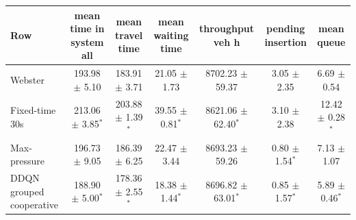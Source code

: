 \begin{tabular}{lcccccc}
\toprule
Row & mean time in system all & mean travel time & mean waiting time & throughput veh h & pending insertion & mean queue \\
\midrule
Webster & 193.98 $\pm$ 5.10 & 183.91 $\pm$ 3.71 & 21.05 $\pm$ 1.73 & 8702.23 $\pm$ 59.37 & 3.05 $\pm$ 2.35 & 6.69 $\pm$ 0.54 \\
Fixed-time 30s & 213.06 $\pm$ 3.85$^{*}$ & 203.88 $\pm$ 1.39$^{*}$ & 39.55 $\pm$ 0.81$^{*}$ & 8621.06 $\pm$ 62.40$^{*}$ & 3.10 $\pm$ 2.38 & 12.42 $\pm$ 0.28$^{*}$ \\
Max-pressure & 196.73 $\pm$ 9.05 & 186.39 $\pm$ 6.25 & 22.47 $\pm$ 3.44 & 8693.23 $\pm$ 59.26 & 0.80 $\pm$ 1.54$^{*}$ & 7.13 $\pm$ 1.07 \\
DDQN grouped cooperative & 188.90 $\pm$ 5.00$^{*}$ & 178.36 $\pm$ 2.55$^{*}$ & 18.38 $\pm$ 1.44$^{*}$ & 8696.82 $\pm$ 63.01$^{*}$ & 0.85 $\pm$ 1.57$^{*}$ & 5.89 $\pm$ 0.46$^{*}$ \\
\bottomrule
\end{tabular}
